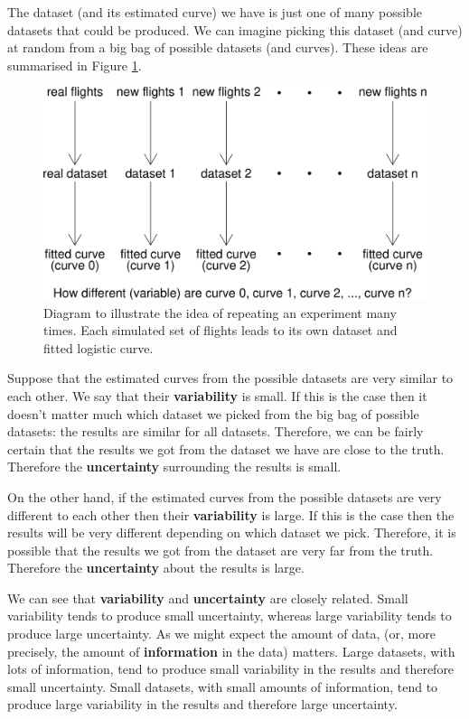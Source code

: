 \documentclass[
  british,
]{book}
\begin{document}
The dataset (and its estimated curve) we have is just one of many possible datasets that could be produced. We can imagine picking this dataset (and curve) at random from a big bag of possible datasets (and curves). These ideas are summarised in Figure \ref{fig:shuttlediagram}.

\begin{figure}

{\centering \includegraphics[width=0.8\linewidth]{images/shuttle_diagram} 

}

\caption{Diagram to illustrate the idea of repeating an experiment many times.  Each simulated set of flights leads to its own dataset and fitted logistic curve.}\label{fig:shuttlediagram}
\end{figure}

Suppose that the estimated curves from the possible datasets are very similar to each other. We say that their \textbf{variability} is small. If this is the case then it doesn't matter much which dataset we picked from the big bag of possible datasets: the results are similar for all datasets. Therefore, we can be fairly certain that the results we got from the dataset we have are close to the truth. Therefore the \textbf{uncertainty} surrounding the results is small.

On the other hand, if the estimated curves from the possible datasets are very different to each other then their \textbf{variability} is large. If this is the case then the results will be very different depending on which dataset we pick. Therefore, it is possible that the results we got from the dataset are very far from the truth. Therefore the \textbf{uncertainty} about the results is large.

We can see that \textbf{variability} and \textbf{uncertainty} are closely related. Small variability tends to produce small uncertainty, whereas large variability tends to produce large uncertainty. As we might expect the amount of data, (or, more precisely, the amount of \textbf{information} in the data) matters. Large datasets, with lots of information, tend to produce small variability in the results and therefore small uncertainty. Small datasets, with small amounts of information, tend to produce large variability in the results and therefore large uncertainty.
\end{document}
